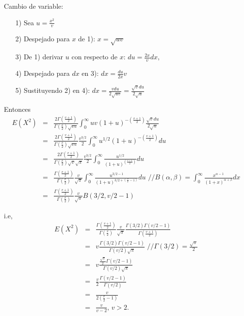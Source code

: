 \begin{i}
Cambio de variable:
\begin{enumerate}
\item[1)] Sea $u=\frac{x^{2}}{v}$

\item[2)] Despejado para $x$ de 1): $x=\sqrt{uv}$

\item[3)] De 1) derivar $u$ con respecto de $x$: $du=\frac{2x}{v}dx$,

\item[4)] Despejado para $dx$ en 3): $dx=\frac{du}{2x}v$

\item[5)] Sustituyendo 2) en 4): $dx=\frac{vdu}{2\sqrt{uv}}=\frac{\sqrt{v}du
}{2\sqrt{u}}$
\end{enumerate}

Entonces
\begin{eqnarray*}
E(X^{2}) &=&\frac{2\Gamma \left( \frac{v+1}{2}\right) }{\Gamma \left( \frac{v
}{2}\right) \sqrt{v\pi }}\int_{0}^{\infty }uv\left( 1+u\right) ^{-\left( 
\frac{v+1}{2}\right) }\frac{\sqrt{v}du}{2\sqrt{u}} \\
&=&\frac{2\Gamma \left( \frac{v+1}{2}\right) }{\Gamma \left( \frac{v}{2}
\right) \sqrt{v\pi }}\frac{v^{3/2}}{2}\int_{0}^{\infty }u^{1/2}\left(
1+u\right) ^{-\left( \frac{v+1}{2}\right) }du \\
&=&\frac{2\Gamma \left( \frac{v+1}{2}\right) }{\Gamma \left( \frac{v}{2}
\right) \sqrt{v}\sqrt{\pi }}\frac{v^{3/2}}{2}\int_{0}^{\infty }\frac{u^{1/2}
}{\left( 1+u\right) ^{\left( \frac{v+1}{2}\right) }}du \\
&=&\frac{\Gamma \left( \frac{v+1}{2}\right) }{\Gamma \left( \frac{v}{2}
\right) }\frac{v}{\sqrt{\pi }}\int_{0}^{\infty }\frac{u^{3/2-1}}{\left(
1+u\right) ^{3/2+\left( \frac{v}{2}-1\right) }}du\text{ \ //}B(\alpha,\beta
)=\int_{0}^{\infty }\frac{x^{\alpha -1}}{(1+x)^{\alpha +\beta }}dx \\
&=&\frac{\Gamma \left( \frac{v+1}{2}\right) }{\Gamma \left( \frac{v}{2}
\right) }\frac{v}{\sqrt{\pi }}B\left( 3/2,v/2-1\right)
\end{eqnarray*}

i.e,
\begin{eqnarray*}
E(X^{2}) &=&\frac{\Gamma \left( \frac{v+1}{2}\right) }{\Gamma \left( \frac{v
}{2}\right) }\frac{v}{\sqrt{\pi }}\frac{\Gamma (3/2)\Gamma (v/2-1)}{\Gamma
\left( \frac{v+1}{2}\right) } \\
&=&v\frac{\Gamma (3/2)\Gamma (v/2-1)}{\Gamma \left( v/2\right) \sqrt{\pi }}
\text{ \ \ \ //}\Gamma (3/2)=\frac{\sqrt{\pi }}{2} \\
&=&v\frac{\frac{\sqrt{\pi }}{2}\Gamma (v/2-1)}{\Gamma \left( v/2\right) 
\sqrt{\pi }} \\
&=&\frac{v}{2}\frac{\Gamma (v/2-1)}{\Gamma \left( v/2\right) } \\
&=&\frac{v}{2\left( \frac{v}{2}-1\right) } \\
&=&\frac{v}{v-2}\text{, \ \ \ }v>2.
\end{eqnarray*}


\end{i}
